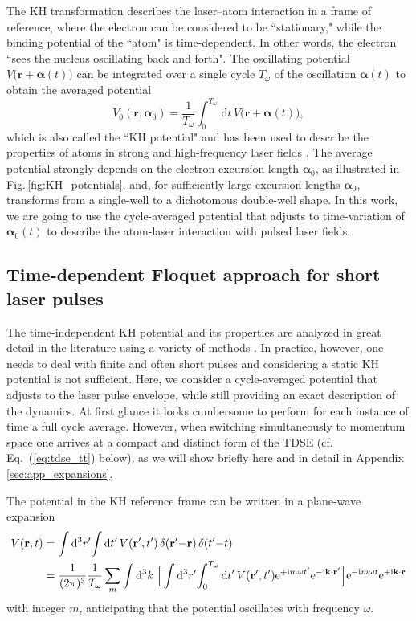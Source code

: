 \documentclass[
pra%
,preprint%
,amssymb, nobibnotes, aps, superscriptaddress, floatfix]{revtex4}
\newcommand{\fig}{Fig.\,}
\renewcommand{\imath}{\mathrm{i}}
\newcommand{\dd}{\mathrm{d}}
\newcommand{\rv}{\mathbf{r}}
\newcommand{\av}{\boldsymbol{\alpha}}
\newcommand{\kv}{\mathbf{k}}
\newcommand{\KNORM}{\frac{1}{(2 \pi)^3}}
\newcommand{\WNORM}{\frac{1}{T_\omega}}
\newcommand{\intK}{\int \dd^3 k}
\def\e#1{\mathrm{e}^{#1}}
\begin{document}
The KH transformation describes the laser--atom interaction in a frame of reference, where the electron can be considered to be ``stationary," while the binding potential of the ``atom" is time-dependent. In other words, the electron ``sees the nucleus oscillating back and forth". The oscillating potential $V\big(\rv + \av(t)\big)$ can be integrated over a single cycle $T_\omega$ of the oscillation $\av(t)$ to obtain the averaged potential
\begin{equation}
V_{0}(\rv, \av_0) = \frac{1}{T_\omega}\int_0^{T_\omega} \, \dd t \, V\big(\rv + \av(t)\big), \label{eq:V0}
\end{equation}
which is also called the ``KH potential" and has been used to describe the properties of atoms in strong and high-frequency laser fields \cite{Pont1988,Pont1990}. The average potential strongly depends on the electron excursion length $\av_0$, as illustrated in \fig \ref{fig:KH_potentials}, and, for sufficiently large excursion lengths $\av_0$, transforms from a single-well to a dichotomous double-well shape.
In this work, we are going to use the cycle-averaged potential that adjusts to time-variation of $\av_0(t)$ to describe the atom-laser interaction with pulsed laser fields.

\subsection{Time-dependent Floquet approach for short laser pulses}

The time-independent KH potential and its properties are analyzed in great detail in the literature using a variety of methods \cite{Gavrila1984,Reed1990,Pont1990,Su1990,Dorr1991,Yao1992,Scrinzi1993,Atabek1997,Smirnova2000,Morales2011}.
In practice, however, one needs to deal with finite and often short pulses and considering a static KH potential is not sufficient.
Here, we consider a cycle-averaged potential that adjusts to the laser pulse envelope, while still providing an exact description of the dynamics. At first glance it looks cumbersome to perform for each instance of time a full cycle average. However, when switching simultaneously to momentum space one arrives at a compact and distinct form of the TDSE (cf. Eq.~(\ref{eq:tdse_tt}) below), as we will show briefly here and in detail in Appendix \ref{sec:app_expansions}.

The potential in the KH reference frame can be written in a plane-wave expansion
\begin{align}
V(\rv,t) & = \int\dd^{3}r'\!\int\dd t'\,V(\rv',t')\,\delta(\rv'{-}\rv)\,\delta(t'{-}t)
\notag\\
&= \KNORM \WNORM \sum_{m} \intK \;
\Big[\int \dd^{3}r'\!\int_{0}^{T_\omega}\dd t'\,V(\rv',t')\e{+\imath m\omega t'}\e{-\imath \kv \cdot \rv'}\Big]
\e{-\imath m\omega t}\e{+\imath \kv \cdot \rv}
\label{eq:expa}
\end{align}
with integer $m$, anticipating that the potential oscillates with frequency $\omega$.
\end{document}
